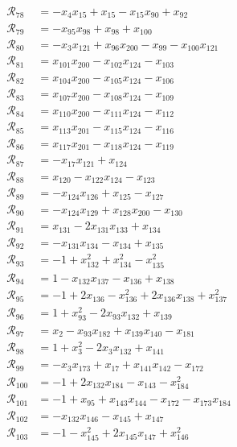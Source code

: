 \begin{align*}
\mathcal R_{78} &= -x_{4}x_{15} +x_{15} -x_{15}x_{90} +x_{92} \\
\mathcal R_{79} &= -x_{95}x_{98} +x_{98} +x_{100} \\
\mathcal R_{80} &= -x_{3}x_{121} +x_{96}x_{200} -x_{99} -x_{100}x_{121} \\
\mathcal R_{81} &= x_{101}x_{200} -x_{102}x_{124} -x_{103} \\
\mathcal R_{82} &= x_{104}x_{200} -x_{105}x_{124} -x_{106} \\
\mathcal R_{83} &= x_{107}x_{200} -x_{108}x_{124} -x_{109} \\
\mathcal R_{84} &= x_{110}x_{200} -x_{111}x_{124} -x_{112} \\
\mathcal R_{85} &= x_{113}x_{201} -x_{115}x_{124} -x_{116} \\
\mathcal R_{86} &= x_{117}x_{201} -x_{118}x_{124} -x_{119} \\
\mathcal R_{87} &= -x_{17}x_{121} +x_{124} \\
\mathcal R_{88} &= x_{120} -x_{122}x_{124} -x_{123} \\
\mathcal R_{89} &= -x_{124}x_{126} +x_{125} -x_{127} \\
\mathcal R_{90} &= -x_{124}x_{129} +x_{128}x_{200} -x_{130} \\
\mathcal R_{91} &= x_{131} -2x_{131}x_{133} +x_{134} \\
\mathcal R_{92} &= -x_{131}x_{134} -x_{134} +x_{135} \\
\mathcal R_{93} &= -1 +x_{132}^{2} +x_{134}^{2} -x_{135}^{2} \\
\mathcal R_{94} &= 1 -x_{132}x_{137} -x_{136} +x_{138} \\
\mathcal R_{95} &= -1 +2x_{136} -x_{136}^{2} +2x_{136}x_{138} +x_{137}^{2} \\
\mathcal R_{96} &= 1 +x_{93}^{2} -2x_{93}x_{132} +x_{139} \\
\mathcal R_{97} &= x_{2} -x_{93}x_{182} +x_{139}x_{140} -x_{181} \\
\mathcal R_{98} &= 1 +x_{3}^{2} -2x_{3}x_{132} +x_{141} \\
\mathcal R_{99} &= -x_{3}x_{173} +x_{17} +x_{141}x_{142} -x_{172} \\
\mathcal R_{100} &= -1 +2x_{132}x_{184} -x_{143} -x_{184}^{2} \\
\mathcal R_{101} &= -1 +x_{95} +x_{143}x_{144} -x_{172} -x_{173}x_{184} \\
\mathcal R_{102} &= -x_{132}x_{146} -x_{145} +x_{147} \\
\mathcal R_{103} &= -1 -x_{145}^{2} +2x_{145}x_{147} +x_{146}^{2} \\

\end{align*}
